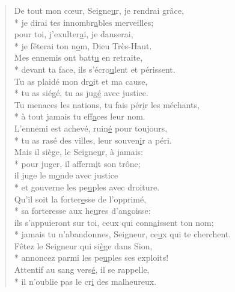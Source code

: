 
\begin{verse}
De tout mon cœur, Seigne\underline{u}r, je rendrai grâce, \\*
je dirai tes innombr\underline{a}bles merveilles; \\
pour toi, j’exulter\underline{a}i, je danserai, \\*
je fêterai ton n\underline{o}m, Dieu Très-Haut. \\

Mes ennemis ont batt\underline{u} en retraite, \\*
devant ta face, ils s’écro\underline{u}lent et périssent. \\
Tu as plaidé mon dr\underline{o}it et ma cause, \\*
tu as siégé, tu as jug\underline{é} avec justice. \\

Tu menaces les nations, tu fais pér\underline{i}r les méchants, \\*
à tout jamais tu eff\underline{a}ces leur nom. \\
L’ennemi est achevé, ruin\underline{é} pour toujours, \\*
tu as rasé des villes, leur souven\underline{i}r a péri. \\

Mais il siège, le Seigne\underline{u}r, à jamais: \\*
pour juger, il afferm\underline{i}t son trône; \\
il juge le m\underline{o}nde avec justice \\*
et gouverne les pe\underline{u}ples avec droiture. \\

Qu’il soit la forter\underline{e}sse de l’opprimé, \\*
sa forteresse aux he\underline{u}res d’angoisse: \\
ils s’appuieront sur toi, ceux qui conn\underline{a}issent ton nom; \\*
jamais tu n’abandonnes, Seigneur, ce\underline{u}x qui te cherchent. \\

Fêtez le Seigneur qui si\underline{è}ge dans Sion, \\*
annoncez parmi les pe\underline{u}ples ses exploits! \\
Attentif au sang vers\underline{é}, il se rappelle, \\*
il n’oublie pas le cr\underline{i} des malheureux. \\


\end{verse}
